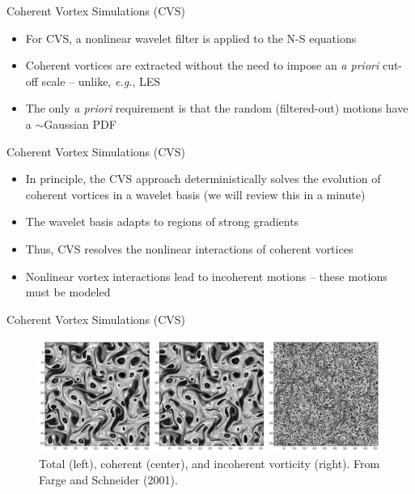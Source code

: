 
\begin{frame}{Coherent Vortex Simulations (CVS)}

\begin{itemize}
	\item For CVS, a nonlinear wavelet filter is applied to the N-S equations
	\item Coherent vortices are extracted without the need to impose an \textit{a priori} cut-off scale -- unlike, \textit{e.g.}, LES
	\item The only \textit{a priori} requirement is that the random (filtered-out) motions have a $\sim$Gaussian PDF
\end{itemize}
\end{frame}


\begin{frame}{Coherent Vortex Simulations (CVS)}

\begin{itemize}
	\item In principle, the CVS approach deterministically solves the evolution of coherent vortices in a wavelet basis (we will review this in a minute)
	\item The wavelet basis adapts to regions of strong gradients
	\item Thus, CVS resolves the nonlinear interactions of coherent vortices
	\item Nonlinear vortex interactions lead to incoherent motions -- these motions must be modeled 
\end{itemize}

\end{frame}


\begin{frame}{Coherent Vortex Simulations (CVS)}
\begin{figure}
	\includegraphics[width=1\textwidth]{cvs2}
	\caption{Total (left), coherent (center), and incoherent vorticity (right). From Farge and Schneider (2001).}
\end{figure}
\end{frame}

